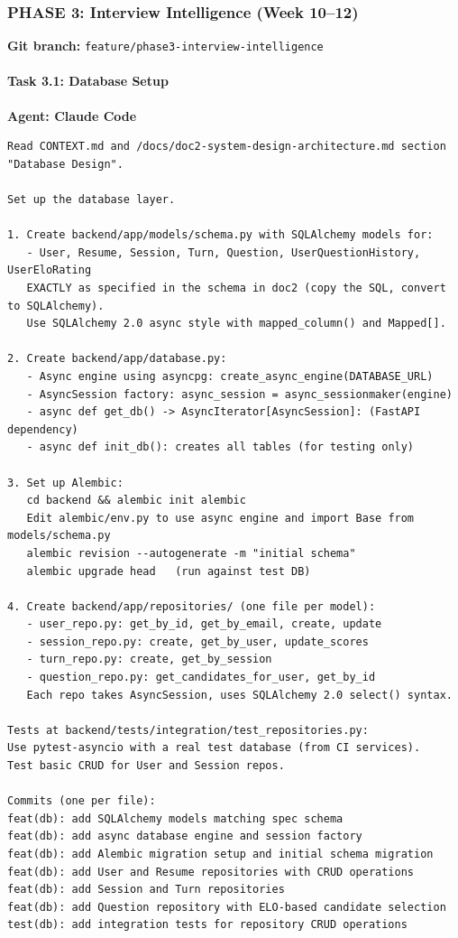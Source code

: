 \documentclass[
  11pt,
]{article}
\newcommand{\passthrough}[1]{#1}
\begin{document}
\hypertarget{phase-3-interview-intelligence-week-1012}{%
\subsubsection{PHASE 3: Interview Intelligence (Week
10--12)}\label{phase-3-interview-intelligence-week-1012}}

\textbf{Git branch:}
\passthrough{\lstinline!feature/phase3-interview-intelligence!}

\hypertarget{task-3.1-database-setup}{%
\paragraph{Task 3.1: Database Setup}\label{task-3.1-database-setup}}

\textbf{Agent: Claude Code}

\begin{lstlisting}
Read CONTEXT.md and /docs/doc2-system-design-architecture.md section "Database Design".

Set up the database layer.

1. Create backend/app/models/schema.py with SQLAlchemy models for:
   - User, Resume, Session, Turn, Question, UserQuestionHistory, UserEloRating
   EXACTLY as specified in the schema in doc2 (copy the SQL, convert to SQLAlchemy).
   Use SQLAlchemy 2.0 async style with mapped_column() and Mapped[].

2. Create backend/app/database.py:
   - Async engine using asyncpg: create_async_engine(DATABASE_URL)
   - AsyncSession factory: async_session = async_sessionmaker(engine)
   - async def get_db() -> AsyncIterator[AsyncSession]: (FastAPI dependency)
   - async def init_db(): creates all tables (for testing only)

3. Set up Alembic:
   cd backend && alembic init alembic
   Edit alembic/env.py to use async engine and import Base from models/schema.py
   alembic revision --autogenerate -m "initial schema"
   alembic upgrade head   (run against test DB)

4. Create backend/app/repositories/ (one file per model):
   - user_repo.py: get_by_id, get_by_email, create, update
   - session_repo.py: create, get_by_user, update_scores
   - turn_repo.py: create, get_by_session
   - question_repo.py: get_candidates_for_user, get_by_id
   Each repo takes AsyncSession, uses SQLAlchemy 2.0 select() syntax.

Tests at backend/tests/integration/test_repositories.py:
Use pytest-asyncio with a real test database (from CI services).
Test basic CRUD for User and Session repos.

Commits (one per file):
feat(db): add SQLAlchemy models matching spec schema
feat(db): add async database engine and session factory
feat(db): add Alembic migration setup and initial schema migration
feat(db): add User and Resume repositories with CRUD operations
feat(db): add Session and Turn repositories
feat(db): add Question repository with ELO-based candidate selection
test(db): add integration tests for repository CRUD operations
\end{lstlisting}
\end{document}
